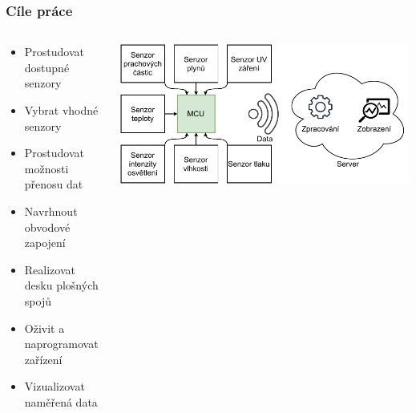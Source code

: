 \documentclass[%
  12pt,       				%
	t,                  %
	aspectratio=1610,   %
	unicode,						%
]{beamer}				    	%
\begin{document}
\disablenavigationsymbols

\maketitle

\begin{frame} 
	\frametitle{Cíle práce}
	\begin{columns}[T]
		\begin{column}{0.4\textwidth}
			\vspace{0.5cm}
			\begin{itemize}
				\item Prostudovat dostupné senzory
				\item Vybrat vhodné senzory
				\item Prostudovat možnosti přenosu dat
				\item Navrhnout obvodové zapojení
				\item Realizovat desku plošných spojů
				\item Oživit a naprogramovat zařízení
    			\item Vizualizovat naměřená data
			\end{itemize}
		\end{column}

		\begin{column}{0.6\textwidth}
			\centering
			\vspace{1.5cm}
			\includegraphics[width=\columnwidth]{obrazky/block_schematic-blank.drawio.pdf}
		\end{column}
	\end{columns}
	
\end{frame}
\end{document}
